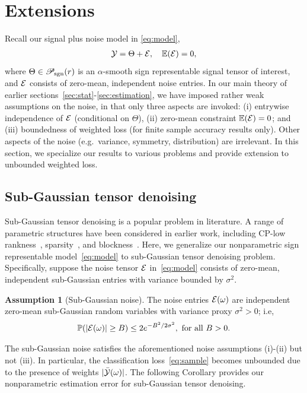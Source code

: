 \documentclass[twoside,11pt]{article}
\theoremstyle{definition}
\newtheorem{assumption}{Assumption}
\def\caliP{\mathscr{P}_{\textup{sgn}}}
\begin{document}
\section{Extensions}\label{sec:extension}


Recall our signal plus noise model in \eqref{eq:model},
\begin{align*}
\mathcal{Y} = \Theta+\mathcal{E},\quad \mathbb{E}(\mathcal{E})=0,
\end{align*}
where $\Theta\in\caliP(r)$ is an $\alpha$-smooth sign representable signal tensor of interest, and $\mathcal{E}$ consists of zero-mean, independent noise entries. In our main theory of earlier sections~\ref{sec:stat}-\ref{sec:estimation}, we have imposed rather weak assumptions on the noise, in that only three aspects are invoked: (i) entrywise independence of $\mathcal{E}$ (conditional on $\Theta$), (ii) zero-mean constraint $\mathbb{E}(\mathcal{E}) = 0$; and (iii) boundedness of weighted loss (for finite sample accuracy results only). Other aspects of the noise (e.g.\ variance, symmetry, distribution) are irrelevant. In this section, we specialize our results to various problems and provide extension to unbounded weighted loss. 

\subsection{Sub-Gaussian tensor denoising} Sub-Gaussian tensor denoising is a popular problem in literature. A range of parametric structures have been considered in earlier work, including CP-low rankness~\citep{anandkumar2014tensor}, sparsity~\citep{allen2012sparse}, and blockness~\citep{wang2019multiway}. Here, we generalize our nonparametric sign representable model~\eqref{eq:model} to sub-Gaussian tensor denoising problem.  
Specifically, suppose the noise tensor $\mathcal{E}$ in~\eqref{eq:model} consists of zero-mean, independent sub-Gaussian entries with variance bounded by $\sigma^2$. 
\begin{assumption}[Sub-Gaussian noise]\label{assm:subg}
The noise entries $\mathcal{E}(\omega)$ are independent zero-mean sub-Gaussian random variables with variance proxy $\sigma^2>0$; i.e, 
\[
\mathbb{P}(|\mathcal{E}(\omega)|\geq B)\leq 2e^{-B^2/2\sigma^2},\  \text{for all}\ B>0.
\] 
\end{assumption}
The sub-Gaussian noise satisfies the aforementioned noise assumptions (i)-(ii) but not (iii). In particular, the classification loss~\eqref{eq:sample} becomes unbounded due to the presence of weights $|\bar {\mathcal{Y}}(\omega)|$. The following Corollary provides our nonparametric estimation error for sub-Gaussian tensor denoising. 
\end{document}

